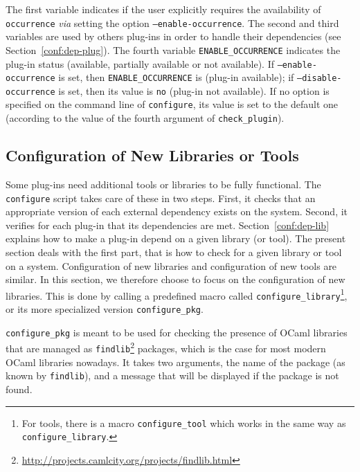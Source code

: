 The first variable indicates if the user explicitly requires the availability of
\texttt{occurrence} \emph{via} setting the option
\texttt{---enable-occurrence}. The second and third variables are used by others
plug-ins in order to handle their dependencies (see
Section~\ref{conf:dep-plug}). The fourth variable \texttt{ENABLE\_OCCURRENCE} indicates
the plug-in status (available, partially available or not available). 
If \texttt{---enable-occurrence} is set, then \texttt{ENABLE\_OCCURRENCE} is \yes
(plug-in available); if \texttt{---disable-occurrence} is set, then its value is
\texttt{no} (plug-in not available). If no option is specified on the command
line of \texttt{configure}, its value is set to the default one (according to
the value of the fourth argument of \texttt{check\_plugin}).

\subsection{Configuration of New Libraries or Tools}
\label{conf:lib}

Some plug-ins need additional tools or libraries to be fully
functional. The \texttt{configure} script takes care of these in two
steps. First, it checks that an appropriate version of each external
dependency exists on the system. Second, it verifies for each plug-in
that its dependencies are met. Section~\ref{conf:dep-lib} explains how
to make a plug-in depend on a given library (or tool). The present
section deals with the first part, that is how to check for a given
library or tool on a system. Configuration of new libraries and configuration of
new tools are similar.  In this section, we therefore choose to focus
on the configuration of new libraries. This is done by calling a
predefined macro called
\texttt{configure\_library}\footnote{For
  tools, there is a macro \texttt{configure\_tool} which works in the
  same way as \texttt{configure\_library}.}, or its more specialized version
\texttt{configure\_pkg}.

\texttt{configure\_pkg} is meant to be used for checking the presence of
OCaml libraries that are managed as
\texttt{findlib}\footnote{\url{http://projects.camlcity.org/projects/findlib.html}}
packages, which is the case for most modern OCaml libraries nowadays.
It takes two arguments, the name of the package (as known by \texttt{findlib}),
and a message that will be displayed if the package is not found.

